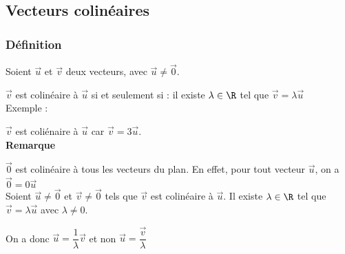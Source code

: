 \newpage 
\subsection{Vecteurs colinéaires}

\subsubsection{Définition}

Soient $\overrightarrow{u}$ et $\overrightarrow{v}$ deux vecteurs, avec $\overrightarrow{u} \neq \overrightarrow{0}$.

$\overrightarrow{v}$ est colinéaire à $\overrightarrow{u}$ si et seulement si : il existe $\lambda \in \R$ tel que $\overrightarrow{v} = \lambda\overrightarrow{u}$ \\

Exemple :


$\overrightarrow{v}$ est coliénaire à $\overrightarrow{u}$ car  $\overrightarrow{v} = 3 \overrightarrow{u}$. \\

\textbf{Remarque}

$\overrightarrow{0}$ est colinéaire à tous les vecteurs du plan. En effet, pour tout vecteur $\overrightarrow{u}$, on a $\overrightarrow{0} = 0 \overrightarrow{u}$ \\

Soient $\overrightarrow{u} \neq \overrightarrow{0}$ et $\overrightarrow{v} \neq \overrightarrow{0}$ tels que $\overrightarrow{v}$ est colinéaire à $\overrightarrow{u}$. Il existe $ \lambda \in \R $ tel que $\overrightarrow{v} = \lambda\overrightarrow{u}$ avec $\lambda \neq 0 $.

On a donc $\overrightarrow{u} = \dfrac{1}{\lambda}\overrightarrow{v}$ et non $\overrightarrow{u} = \dfrac{\overrightarrow{v}}{\lambda}$

